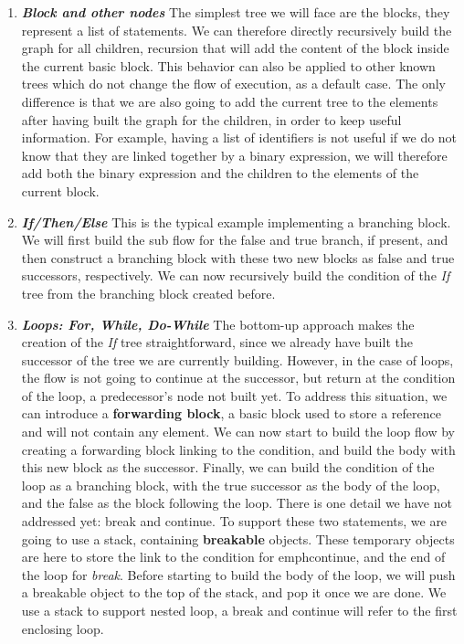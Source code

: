 \begin{enumerate}
	\item \textbf{\textit{Block and other nodes}} \newline 
	\label{subsubsec:block_and_others}
	The simplest tree we will face are the blocks, they represent a list of statements.
	We can therefore directly recursively build the graph for all children, recursion that will add the content of the block inside the current basic block. 
	This behavior can also be applied to other known trees which do not change the flow of execution, as a default case.
	The only difference is that we are also going to add the current tree to the elements after having built the graph for the children, in order to keep useful information. 
	For example, having a list of identifiers is not useful if we do not know that they are linked together by a binary expression, we will therefore add both the binary expression and the children to the elements of the current block.
	
	\item \textbf{\textit{If/Then/Else}} \newline 
	\label{subsubsec:if_then_else}
	This is the typical example implementing a branching block. 
	We will first build the sub flow for the false and true branch, if present, and then construct a branching block with these two new blocks as false and true successors, respectively.
	We can now recursively build the condition of the \emph{If} tree from the branching block created before.
	
	\item \textbf{\textit{Loops: For, While, Do-While}} \newline 
	\label{subsubsec:loops_cfg}
	The bottom-up approach makes the creation of the \emph{If} tree straightforward, since we already have built the successor of the tree we are currently building. 
	However, in the case of loops, the flow is not going to continue at the successor, but return at the condition of the loop, a predecessor’s node not built yet.
	To address this situation, we can introduce a \textbf{forwarding block}, a basic block used to store a reference and will not contain any element.
	We can now start to build the loop flow by creating a forwarding block linking to the condition, and build the body with this new block as the successor. 
	Finally, we can build the condition of the loop as a branching block, with the true successor as the body of the loop, and the false as the block following the loop.
	There is one detail we have not addressed yet: break and continue.
	To support these two statements, we are going to use a stack, containing \textbf{breakable} objects. 
	These temporary objects are here to store the link to the condition for emph{continue}, and the end of the loop for \emph{break}.
	Before starting to build the body of the loop, we will push a breakable object to the top of the stack, and pop it once we are done. 
	We use a stack to support nested loop, a break and continue will refer to the first enclosing loop.
	

\end{enumerate}
